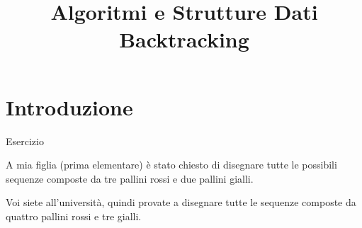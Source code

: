 
\title[ASD - Backtracking]{\textbf{Algoritmi e Strutture Dati}\\[24pt]Backtracking}

\usepackage[mode=buildnew]{standalone}
\usepackage{xcolor}
\usepackage{colortbl}
\usepackage{epigraph}
\usepackage{tikz}
\usepackage{xmpmulti}
\usepackage{listings}

\newcommand{\R}[1]{\textcolor{red}{#1}}
\newcommand{\B}[1]{\textcolor{blue}{#1}}

\renewcommand{\arraystretch}{1.4}
\graphicspath{{figs/16/}}

\renewcommand{\enumerazione}{\fontproc{enumeration}}
\newcommand{\isAdmissible}{\fontproc{accept}}
\newcommand{\isImpossible}{\fontproc{reject}}




\FrameTitle{}

\FrameContent



\section{Introduzione}

\begin{frame}{Esercizio}

A mia figlia (prima elementare) è stato chiesto di disegnare tutte le
possibili sequenze composte da tre pallini rossi e due pallini gialli. 

\medskip
Voi siete all'università, quindi provate a disegnare tutte le sequenze composte da quattro 
pallini rossi e tre gialli.

\end{frame} 


